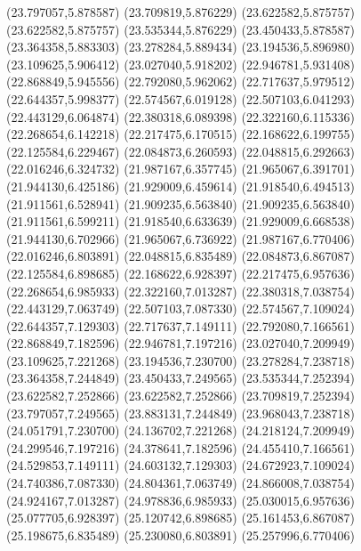 {{\lineto(23.797057,5.878587)
\lineto(23.709819,5.876229)
\lineto(23.622582,5.875757)
\lineto(23.622582,5.875757)
\lineto(23.535344,5.876229)
\lineto(23.450433,5.878587)
\lineto(23.364358,5.883303)
\lineto(23.278284,5.889434)
\lineto(23.194536,5.896980)
\lineto(23.109625,5.906412)
\lineto(23.027040,5.918202)
\lineto(22.946781,5.931408)
\lineto(22.868849,5.945556)
\lineto(22.792080,5.962062)
\lineto(22.717637,5.979512)
\lineto(22.644357,5.998377)
\lineto(22.574567,6.019128)
\lineto(22.507103,6.041293)
\lineto(22.443129,6.064874)
\lineto(22.380318,6.089398)
\lineto(22.322160,6.115336)
\lineto(22.268654,6.142218)
\lineto(22.217475,6.170515)
\lineto(22.168622,6.199755)
\lineto(22.125584,6.229467)
\lineto(22.084873,6.260593)
\lineto(22.048815,6.292663)
\lineto(22.016246,6.324732)
\lineto(21.987167,6.357745)
\lineto(21.965067,6.391701)
\lineto(21.944130,6.425186)
\lineto(21.929009,6.459614)
\lineto(21.918540,6.494513)
\lineto(21.911561,6.528941)
\lineto(21.909235,6.563840)
\lineto(21.909235,6.563840)
\lineto(21.911561,6.599211)
\lineto(21.918540,6.633639)
\lineto(21.929009,6.668538)
\lineto(21.944130,6.702966)
\lineto(21.965067,6.736922)
\lineto(21.987167,6.770406)
\lineto(22.016246,6.803891)
\lineto(22.048815,6.835489)
\lineto(22.084873,6.867087)
\lineto(22.125584,6.898685)
\lineto(22.168622,6.928397)
\lineto(22.217475,6.957636)
\lineto(22.268654,6.985933)
\lineto(22.322160,7.013287)
\lineto(22.380318,7.038754)
\lineto(22.443129,7.063749)
\lineto(22.507103,7.087330)
\lineto(22.574567,7.109024)
\lineto(22.644357,7.129303)
\lineto(22.717637,7.149111)
\lineto(22.792080,7.166561)
\lineto(22.868849,7.182596)
\lineto(22.946781,7.197216)
\lineto(23.027040,7.209949)
\lineto(23.109625,7.221268)
\lineto(23.194536,7.230700)
\lineto(23.278284,7.238718)
\lineto(23.364358,7.244849)
\lineto(23.450433,7.249565)
\lineto(23.535344,7.252394)
\lineto(23.622582,7.252866)
\lineto(23.622582,7.252866)
\lineto(23.709819,7.252394)
\lineto(23.797057,7.249565)
\lineto(23.883131,7.244849)
\lineto(23.968043,7.238718)
\lineto(24.051791,7.230700)
\lineto(24.136702,7.221268)
\lineto(24.218124,7.209949)
\lineto(24.299546,7.197216)
\lineto(24.378641,7.182596)
\lineto(24.455410,7.166561)
\lineto(24.529853,7.149111)
\lineto(24.603132,7.129303)
\lineto(24.672923,7.109024)
\lineto(24.740386,7.087330)
\lineto(24.804361,7.063749)
\lineto(24.866008,7.038754)
\lineto(24.924167,7.013287)
\lineto(24.978836,6.985933)
\lineto(25.030015,6.957636)
\lineto(25.077705,6.928397)
\lineto(25.120742,6.898685)
\lineto(25.161453,6.867087)
\lineto(25.198675,6.835489)
\lineto(25.230080,6.803891)
\lineto(25.257996,6.770406)
}}
